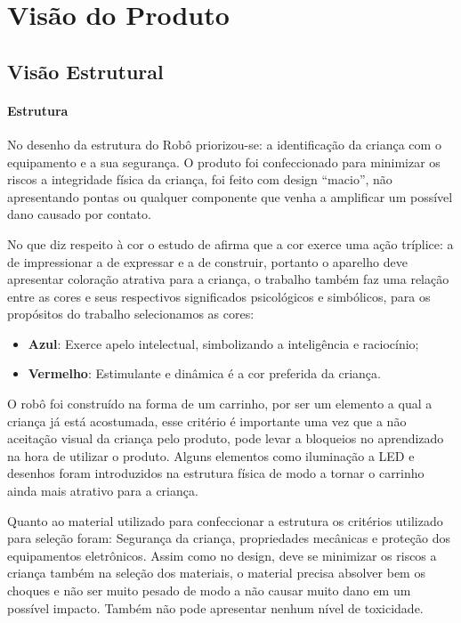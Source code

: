 \chapter[Visão do Produto]{Visão do Produto}

\section{Visão Estrutural}

\subsubsection{Estrutura}
No desenho da estrutura do Robô priorizou-se: a identificação da criança com o equipamento e a sua segurança.
O produto foi confeccionado para minimizar os riscos a integridade física da criança, foi feito com design “macio”,
não apresentando pontas ou qualquer componente que venha a amplificar um possível dano causado por contato.

No que diz respeito à cor o estudo de  afirma que a cor exerce uma ação tríplice: a de impressionar
a de expressar e a de construir, portanto o aparelho deve apresentar coloração atrativa para a criança, o trabalho também
faz uma relação entre as cores e seus respectivos significados psicológicos e simbólicos, para os propósitos do trabalho
selecionamos as cores:

\begin{itemize}
    \item \textbf{Azul}: Exerce apelo intelectual, simbolizando a inteligência e raciocínio;
    \item \textbf{Vermelho}: Estimulante e dinâmica é a cor preferida da criança.
\end{itemize}

O robô foi construído na forma de um carrinho, por ser um elemento a qual a criança já está acostumada, esse critério
é importante uma vez que a não aceitação visual da criança pelo produto, pode levar a bloqueios no aprendizado na hora
de utilizar o produto. Alguns elementos como iluminação a LED e desenhos foram introduzidos na estrutura física de modo
a tornar o carrinho ainda mais atrativo para a criança.

Quanto ao material utilizado para confeccionar a estrutura os critérios utilizado para seleção foram: Segurança da
criança, propriedades mecânicas e proteção dos equipamentos eletrônicos. Assim como no design, deve se minimizar os
riscos a criança também na seleção dos materiais, o material precisa absolver bem os choques e não ser muito pesado
de modo a não causar muito dano em um possível impacto. Também não pode apresentar nenhum nível de toxicidade.

